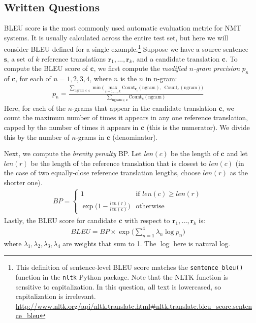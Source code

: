 \documentclass{assignment format}
\begin{document}
\subsection{Written Questions}
BLEU score is the most commonly used automatic evaluation metric for NMT systems. It is usually calculated across the entire test set, but here we will consider BLEU defined for a single example.\footnote{This definition of sentence-level BLEU score matches the \texttt{sentence\_bleu()} function in the \texttt{nltk} Python package. Note that the NLTK function is sensitive to capitalization. In this question, all text is lowercased, so capitalization is irrelevant. \\ \url{http://www.nltk.org/api/nltk.translate.html\#nltk.translate.bleu_score.sentence_bleu}
    }
    Suppose we have a source sentence $\mathbf{s}$, a set of $k$ reference translations $\mathbf{r}_1,\dots,\mathbf{r}_k$, and a candidate translation $\mathbf{c}$. To compute the BLEU score of $\mathbf{c}$, we first compute the \textit{modified $n$-gram precision} $p_n$ of $\mathbf{c}$, for each of $n=1,2,3,4$, where $n$ is the $n$ in \href{https://en.wikipedia.org/wiki/N-gram}{n-gram}:
    \begin{align}
        p_n = \frac{ \displaystyle \sum_{\text{ngram} \in \mathbf{c}} \min \bigg( \max_{i=1,\dots,k} \text{Count}_{\mathbf{r}_i}(\text{ngram}), \enspace \text{Count}_{\mathbf{c}}(\text{ngram}) \bigg) }{\displaystyle \sum_{\text{ngram}\in \mathbf{c}} \text{Count}_{\mathbf{c}}(\text{ngram})}
    \end{align}
     Here, for each of the $n$-grams that appear in the candidate translation $\mathbf{c}$, we count the maximum number of times it appears in any one reference translation, capped by the number of times it appears in $\mathbf{c}$ (this is the numerator). We divide this by the number of $n$-grams in $\mathbf{c}$ (denominator). \newline 

    Next, we compute the \textit{brevity penalty} BP. Let $len(c)$ be the length of $\mathbf{c}$ and let $len(r)$ be the length of the reference translation that is closest to $len(c)$ (in the case of two equally-close reference translation lengths, choose $len(r)$ as the shorter one). 
    \begin{align}
        BP = 
        \begin{cases}
            1 & \text{if } len(c) \ge len(r) \\
            \exp \big( 1 - \frac{len(r)}{len(c)} \big) & \text{otherwise}
        \end{cases}
    \end{align}
    Lastly, the BLEU score for candidate $\mathbf{c}$ with respect to $\mathbf{r}_1,\dots,\mathbf{r}_k$ is:
    \begin{align}
        BLEU = BP \times \exp \Big( \sum_{n=1}^4 \lambda_n \log p_n \Big)
    \end{align}
    where $\lambda_1,\lambda_2,\lambda_3,\lambda_4$ are weights that sum to 1. The $\log$ here is natural log.
    \newline
    
\end{document}
